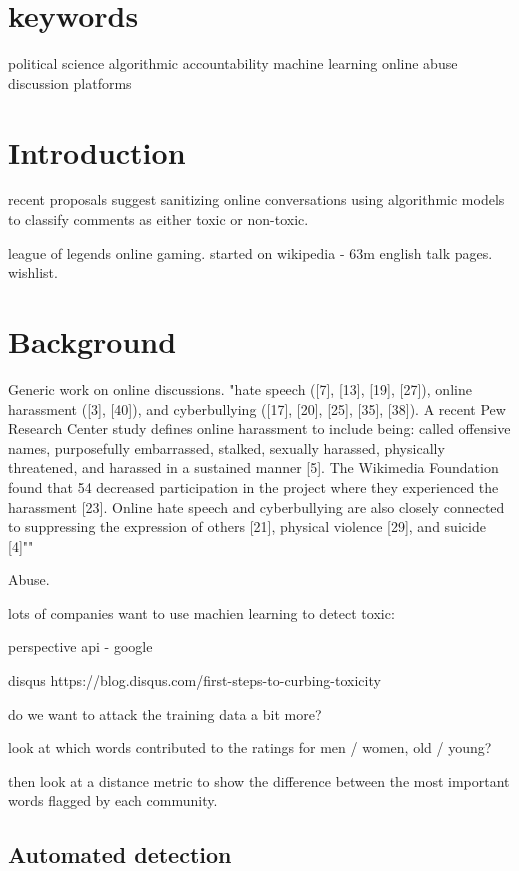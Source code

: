 \documentclass[sigconf]{acmart}
\begin{document}
\section{keywords} political science
algorithmic accountability
machine learning
online abuse
discussion platforms

\section{Introduction}

recent proposals suggest sanitizing online conversations using algorithmic models to classify comments as either toxic or non-toxic.

 league of legends online gaming. started on wikipedia - 63m english talk pages. wishlist.

\section{Background}

Generic work on online discussions.
"hate speech ([7], [13], [19], [27]), online
harassment ([3], [40]), and cyberbullying ([17], [20], [25], [35],
[38]).
 A recent Pew Research Center study defines online
harassment to include being: called offensive names, purposefully
embarrassed, stalked, sexually harassed, physically threatened,
and harassed in a sustained manner [5].
The Wikimedia Foundation found that
54%
decreased participation in the project where they experienced the
harassment [23]. Online hate speech and cyberbullying are also
closely connected to suppressing the expression of others [21], physical
violence [29], and suicide [4]""

Abuse.

lots of companies want to use machien learning to detect toxic:

perspective api - google

disqus
https://blog.disqus.com/first-steps-to-curbing-toxicity

do we want to attack the training data a bit more?

look at which words contributed to the ratings for men / women, old / young?

then look at a distance metric to show the difference between the most important words flagged by each community.

\subsection{Automated detection}
\end{document}
